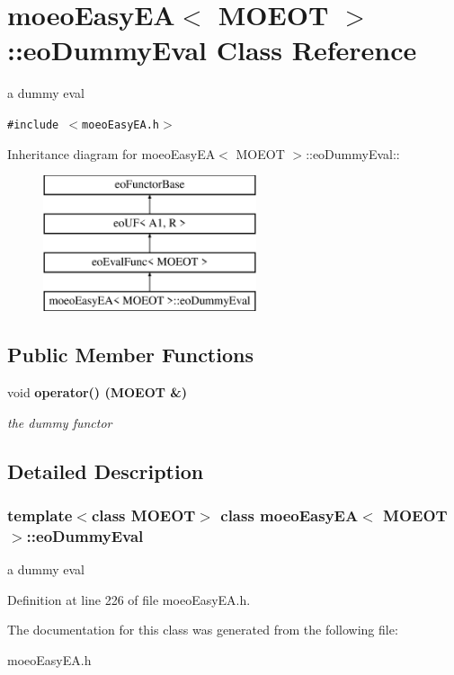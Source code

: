 \section{moeo\-Easy\-EA$<$ MOEOT $>$::eo\-Dummy\-Eval Class Reference}
\label{classmoeoEasyEA_1_1eoDummyEval}
a dummy eval  


{\tt \#include $<$moeo\-Easy\-EA.h$>$}

Inheritance diagram for moeo\-Easy\-EA$<$ MOEOT $>$::eo\-Dummy\-Eval::\begin{figure}[H]
\begin{center}
\leavevmode
\includegraphics[height=4cm]{classmoeoEasyEA_1_1eoDummyEval}
\end{center}
\end{figure}
\subsection*{Public Member Functions}
\begin{CompactItemize}
\item 
void \bf{operator()} (MOEOT \&)\label{classmoeoEasyEA_1_1eoDummyEval_1ed55869451f883db2fc43c60f7caff5}

\begin{CompactList}\small\item\em the dummy functor \item\end{CompactList}\end{CompactItemize}


\subsection{Detailed Description}
\subsubsection*{template$<$class MOEOT$>$ class moeo\-Easy\-EA$<$ MOEOT $>$::eo\-Dummy\-Eval}

a dummy eval 



Definition at line 226 of file moeo\-Easy\-EA.h.

The documentation for this class was generated from the following file:\begin{CompactItemize}
\item 
moeo\-Easy\-EA.h\end{CompactItemize}
